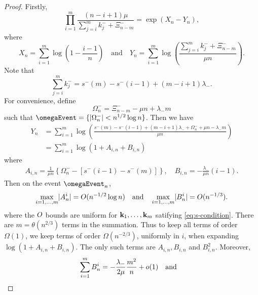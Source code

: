 \begin{proof}
    Firstly,
    \begin{equation*}
        \prod_{i=1}^m \frac{(n-i+1)\mu}{\sum_{j=i}^m k_j^- + \Xi^-_{n-m}} = \exp(X_n - Y_n),
    \end{equation*}
    where
    \begin{equation*}
        X_n = \sum_{i=1}^m \log\left( 1 - \frac{i-1}{n} \right)
        \quad \text{and} \quad
        Y_n = \sum_{i=1}^m \log\left( \frac{\sum_{j=i}^m k_j^- + \Xi^-_{n-m}}{\mu n} \right).
    \end{equation*}
    Note that
    \begin{equation*}
        \sum_{j=i}^m k^-_j = s^-(m) - s^-(i - 1) + (m - i + 1) \lambda_-.
    \end{equation*}
    For convenience, define
    \begin{equation*}
        \Omega^-_n = \Xi^-_{n-m} - \mu n + \lambda_- m
    \end{equation*}
    such that $\omegaEvent = \{ \abs{\Omega^-_n} < n^{1/2} \log n \}$. Then we have
    \begin{align*}
        Y_n 
        &= \sum_{i=1}^m \log \left( \frac{s^-(m) - s^-(i-1) + (m - i + 1) \lambda_- + \Omega^-_n + \mu n - \lambda_- m}{\mu n} \right) \\
        &= \sum_{i=1}^m \log \left( 1 + A_{i, n} + B_{i, n} \right)
    \end{align*}
    where
    \begin{align*}
        A_{i, n} = \frac{1}{\mu n} \left\{ 
            \Omega_n^- -\left[ s^-(i-1) - s^-(m) \right] 
        \right\}, \quad
        B_{i, n} = - \frac{\lambda_-}{\mu n} (i-1).
    \end{align*}
    Then on the event $\omegaEvent_n$,
    \begin{equation*}
        \max_{i=1, \ldots, m} \lvert A_n^i\rvert = O(n^{-1/2} \log n)
        \quad \text{and} \quad
        \max_{i=1, \ldots, m} \lvert B_n^i\rvert = O(n^{-1/3}).
    \end{equation*}
    where the $O$ bounds are uniform for ${\mathbf k}_1, \ldots, {\mathbf k}_m$ satifying \cref{eq:s-condition}. There are $m = \theta(n^{2/3})$ terms in the summation. Thus to keep all terms of order $\Omega(1)$, we keep terms of order $\Omega(n^{-2/3})$, uniformly in $i$, when expanding $\log(1 + A_{i, n} + B_{i, n})$. The only such terms are $A_{i, n}, B_{i, n}$ and $B_{i, n}^2$. Moreover,
    \begin{equation*}
        \sum_{i=1}^m B_n^i = - \frac{\lambda_-}{2 \mu} \frac{m^2}{n} + \littleo(1) \quad \text{and} \quad

\end{equation*}
\end{proof}
